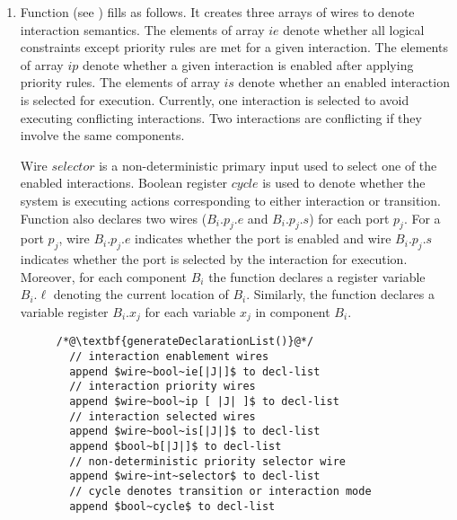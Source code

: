 \begin{enumerate}
\item Function  (see ) fills  as follows. 
It creates three arrays of wires to denote interaction semantics. 
The elements of array $\mathit{ie}$ denote whether all logical constraints except priority rules are met for a given interaction. 
The elements of array $\mathit{ip}$ denote whether a given interaction is enabled after applying priority rules. 
The elements of array $\mathit{is}$ denote whether an enabled interaction is selected for execution. 
Currently, one interaction is selected to avoid executing conflicting interactions. 
Two interactions are conflicting if they involve the same components. 

Wire $\mathit{selector}$ is a non-deterministic primary input used to select one of the enabled interactions.
Boolean register $\mathit{cycle}$ is used to denote whether the system is executing actions corresponding to either interaction or transition. 
Function  also declares two wires ($B_i.p_j.e$ and $B_i.p_j.s$) for each port $p_j$. 
For a port $p_j$, wire $B_i.p_j.e$ indicates whether the port is enabled and wire $B_i.p_j.s$ indicates whether the port is selected by the interaction for execution. 
Moreover, for each component $B_i$ the function declares a register variable $B_i.\ell$ denoting the current location of $B_i$. 
Similarly, the function declares a variable register $B_i.x_j$ for each variable $x_j$ in component $B_i$.  

\begin{figure}
\begin{lstlisting}
/*@\textbf{generateDeclarationList()}@*/
  // interaction enablement wires
  append $wire~bool~ie[|J|]$ to decl-list
  // interaction priority wires
  append $wire~bool~ip [ |J| ]$ to decl-list 
  // interaction selected wires
  append $wire~bool~is[|J|]$ to decl-list 
  append $bool~b[|J|]$ to decl-list 
  // non-deterministic priority selector wire
  append $wire~int~selector$ to decl-list 
  // cycle denotes transition or interaction mode
  append $bool~cycle$ to decl-list  


\end{lstlisting}
\end{figure}
\end{enumerate}
